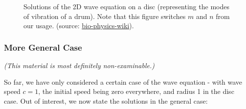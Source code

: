 \begin{enumerate}
	\begin{figure}
		\caption{Solutions of the 2D wave equation on a disc (representing the modes of vibration of a drum). Note that this figure switches $m$ and $n$ from our usage. (source: \href{http://www.bio-physics.at/wiki/index.php?title=File:Vibrations.png}{bio-physics-wiki}).}
		\label{fig:wave2d}
	\end{figure}
\end{enumerate}

\subsubsection{More General Case}

\emph{(This material is most definitely non-examinable.)}

So far, we have only considered a certain case of the wave equation - with wave speed $c=1$, the initial speed being zero everywhere, and radius 1 in the disc case. Out of interest, we now state the solutions in the general case:

